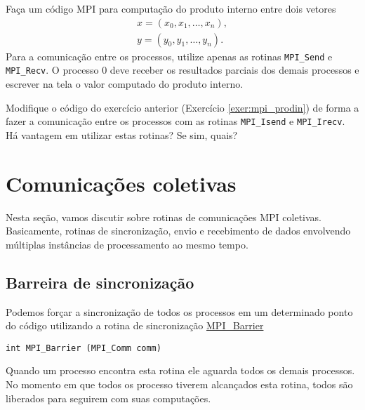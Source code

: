 \begin{exer}\label{exer:mpi_prodin}
  Faça um código MPI para computação do produto interno entre dois vetores
  \begin{gather}
    x = (x_0, x_1, \dotsc, x_n),\\
    y = (y_0, y_1, \dotsc, y_n).
  \end{gather}
  Para a comunicação entre os processos, utilize apenas as rotinas \verb+MPI_Send+ e \verb+MPI_Recv+. O processo 0 deve receber os resultados parciais dos demais processos e escrever na tela o valor computado do produto interno.
\end{exer}

\begin{exer}
  Modifique o código do exercício anterior (Exercício \ref{exer:mpi_prodin}) de forma a fazer a comunicação entre os processos com as rotinas \verb+MPI_Isend+ e \verb+MPI_Irecv+. Há vantagem em utilizar estas rotinas? Se sim, quais?
\end{exer}

\section {Comunicações coletivas}\label{cap_mpi_sec_colcom}

Nesta seção, vamos discutir sobre rotinas de comunicações MPI coletivas. Basicamente, rotinas de sincronização, envio e recebimento de dados envolvendo múltiplas instâncias de processamento ao mesmo tempo.

\subsection {Barreira de sincronização}

Podemos forçar a sincronização de todos os processos em um determinado ponto do código utilizando a rotina de sincronização \href{https://www.open-mpi.org/doc/current/man3/MPI\_Barrier.3.php}{MPI\_Barrier}
\begin{verbatim}
int MPI_Barrier (MPI_Comm comm)
\end{verbatim}
Quando um processo encontra esta rotina ele aguarda todos os demais processos. No momento em que todos os processo tiverem alcançados esta rotina, todos são liberados para seguirem com suas computações.

